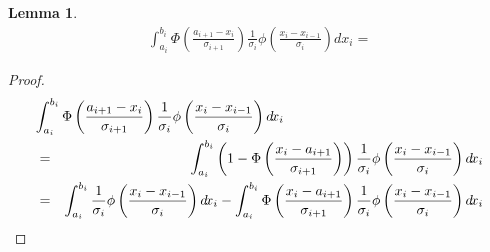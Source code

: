 \documentclass{article}
\newtheorem{lemma}{Lemma}
\begin{document}
\begin{lemma}
  \begin{eqnarray*}
    \int_{a_i}^{b_i} \Phi\left( \frac{a_{i+1} - x_i}{\sigma_{i+1}} \right) \frac{1}{\sigma_i} \phi\left(\frac{x_i - x_{i-1}}{\sigma_i}\right) d\!x_i = 
  \end{eqnarray*}
\end{lemma}
\begin{proof}
  \begin{eqnarray*}
    \lefteqn{\int_{a_i}^{b_i} \Phi\left( \frac{a_{i+1} - x_i}{\sigma_{i+1}} \right) \frac{1}{\sigma_i} \phi\left(\frac{x_i - x_{i-1}}{\sigma_i}\right) d\!x_i}\\
    & = & \int_{a_i}^{b_i} \left(1 - \Phi\left( \frac{x_i - a_{i+1}}{\sigma_{i+1}} \right)\right) \frac{1}{\sigma_i} \phi\left(\frac{x_i - x_{i-1}}{\sigma_i}\right) d\!x_i\\
    & = & \int_{a_i}^{b_i} \frac{1}{\sigma_i} \phi\left(\frac{x_i - x_{i-1}}{\sigma_i}\right) d\!x_i - \int_{a_i}^{b_i} \Phi\left( \frac{x_i - a_{i+1}}{\sigma_{i+1}} \right) \frac{1}{\sigma_i} \phi\left(\frac{x_i - x_{i-1}}{\sigma_i}\right) d\!x_i\\
  \end{eqnarray*}
\end{proof}
\end{document}
